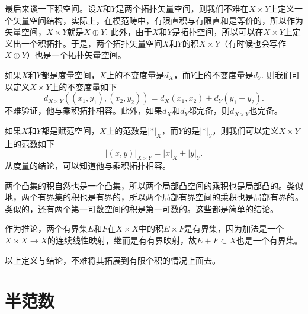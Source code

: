 \begin{para}
	最后来谈一下积空间。设$X$和$Y$是两个拓扑矢量空间，则我们不难在$X\times Y$上定义一个矢量空间结构，实际上，在模范畴中，有限直积与有限直和是等价的，所以作为矢量空间，$X\times Y$就是$X\oplus Y$. 此外，由于$X$和$Y$是拓扑空间，所以可以在$X\times Y$上定义出一个积拓扑。于是，两个拓扑矢量空间$X$和$Y$的积$X\times Y$（有时候也会写作$X\oplus Y$）也是一个拓扑矢量空间。

	如果$X$和$Y$都是度量空间，$X$上的不变度量是$d_X$，而$Y$上的不变度量是$d_Y$. 则我们可以定义$X\times Y$上的不变度量如下
	\[
	d_{X\times Y}\left((x_1,y_1),(x_2,y_2)\right)=d_X(x_1,x_2)+d_Y(y_1+y_2).
	\]
	不难验证，他与乘积拓扑相容。此外，如果$d_X$和$d_Y$都完备，则$d_{X\times Y}$也完备。

	如果$X$和$Y$都是赋范空间，$X$上的范数是$|*|_X$，而$Y$的是$|*|_Y$，则我们可以定义$X\times Y$上的范数如下
	\[
	|(x,y)|_{X\times Y}=|x|_X+|y|_Y.
	\]
	从度量的结论，可以知道他与乘积拓扑相容。

	两个凸集的积自然也是一个凸集，所以两个局部凸空间的乘积也是局部凸的。类似地，两个有界集的积也是有界的，所以两个局部有界空间的乘积也是局部有界的。类似的，还有两个第一可数空间的积是第一可数的。这些都是简单的结论。

	作为推论，两个有界集$E$和$F$在$X\times X$中的积$E\times F$是有界集，因为加法是一个$X\times X\to X$的连续线性映射，继而是有有界映射，故$E+F\subset X$也是一个有界集。
\end{para}

以上定义与结论，不难将其拓展到有限个积的情况上面去。

\section{半范数}

